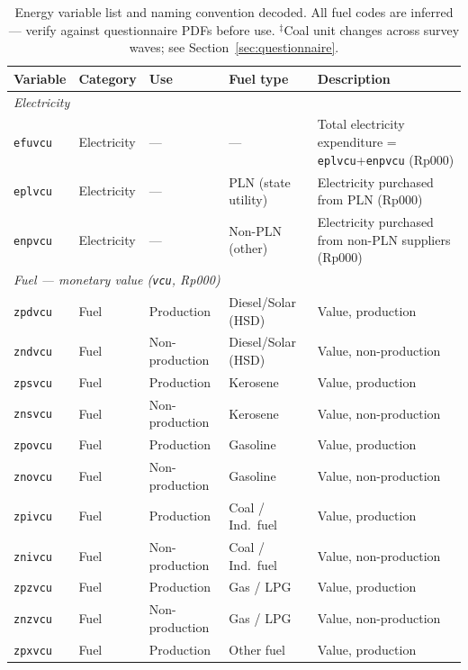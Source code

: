\documentclass[11pt, a4paper]{article}
\begin{document}
\begin{table}[H]
\centering
\caption{Energy variable list and naming convention decoded. All fuel codes are inferred ---
  verify against questionnaire PDFs before use. $^\ddagger$Coal unit changes across survey waves;
  see Section~\ref{sec:questionnaire}.}
\label{tab:varlist}
\small\setlength{\tabcolsep}{5pt}
\begin{tabular}{lllp{3.2cm}p{5.5cm}}
\toprule
\textbf{Variable} & \textbf{Category} & \textbf{Use} & \textbf{Fuel type} & \textbf{Description} \\
\midrule
\multicolumn{5}{l}{\textit{Electricity}} \\
\texttt{efuvcu} & Electricity & --- & --- & Total electricity expenditure = \texttt{eplvcu}+\texttt{enpvcu} (Rp000) \\
\texttt{eplvcu} & Electricity & --- & PLN (state utility)   & Electricity purchased from PLN (Rp000) \\
\texttt{enpvcu} & Electricity & --- & Non-PLN (other)       & Electricity purchased from non-PLN suppliers (Rp000) \\
\midrule
\multicolumn{5}{l}{\textit{Fuel --- monetary value (\texttt{vcu}, Rp000)}} \\
\texttt{zpdvcu} & Fuel & Production     & Diesel/Solar (HSD) & Value, production \\
\texttt{zndvcu} & Fuel & Non-production & Diesel/Solar (HSD) & Value, non-production \\
\texttt{zpsvcu} & Fuel & Production     & Kerosene           & Value, production \\
\texttt{znsvcu} & Fuel & Non-production & Kerosene           & Value, non-production \\
\texttt{zpovcu} & Fuel & Production     & Gasoline           & Value, production \\
\texttt{znovcu} & Fuel & Non-production & Gasoline           & Value, non-production \\
\texttt{zpivcu} & Fuel & Production     & Coal / Ind.\ fuel  & Value, production \\
\texttt{znivcu} & Fuel & Non-production & Coal / Ind.\ fuel  & Value, non-production \\
\texttt{zpzvcu} & Fuel & Production     & Gas / LPG          & Value, production \\
\texttt{znzvcu} & Fuel & Non-production & Gas / LPG          & Value, non-production \\
\texttt{zpxvcu} & Fuel & Production     & Other fuel         & Value, production \\

\end{tabular}
\end{table}
\end{document}

